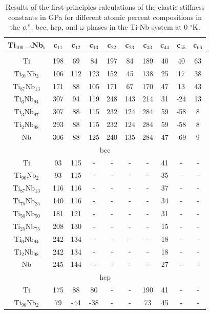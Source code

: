 \newpage
\begin{longtable}[H]{ c c c c c c c c c c }
	\caption{Results of the first-principles calculations of the elastic stiffness constants in GPa for different atomic percent compositions in the $\alpha"$, bcc, hcp, and $\omega$  phases in the Ti-Nb system at 0 $^\circ$K.} 	\label{Ch7-table:tinbdata} \\
	\hline
	Ti$_{100-b}$Nb$_b$ & c$_{11}$ & c$_{12}$ & c$_{13}$ & c$_{22}$ & c$_{23}$ & c$_{33}$ & c$_{44}$ & c$_{55}$ & c$_{66}$\\
	\hline
	\endhead
	\hline
	\endfoot
	\multicolumn{10}{c}{$\alpha"$}\\
	\hline
	Ti & 198 & 69 & 84 & 197 & 84 & 189 & 40 & 40 & 63 \\		
	Ti$_{97}$Nb$_{3}$ & 106 & 112 & 123 & 152 & 45 & 138 & 25 & 17 & 38 \\
	Ti$_{87}$Nb$_{13}$ & 171 & 88 & 105 & 171 & 67 & 170 & 47 & 13 & 43 \\
	Ti$_{6}$Nb$_{94}$ & 307 & 94 & 119 & 248 & 143 & 214 & 31 & -24 & 13 \\
	Ti$_{3}$Nb$_{97}$ & 307 & 88 & 115 & 232 & 124 & 284 & 59 & -58 & 8 \\
	Ti$_{2}$Nb$_{98}$ & 293 & 88 & 115 & 232 & 124 & 284 & 59 & -58 & 8 \\
	Nb & 306 & 88 & 125 & 240 & 135 & 284 & 47 & -69 & 9 \\
	\hline
	\multicolumn{10}{c}{bcc}\\
	\hline
	Ti & 93 & 115 & - & - & - & - & 41 & - & - \\		
	Ti$_{98}$Nb$_{2}$ & 93 & 115 & - & - & - & - & 35 & - & - \\
	Ti$_{87}$Nb$_{13}$ & 116 & 116 & - & - & - & - & 37 & - & - \\
	Ti$_{75}$Nb$_{25}$ & 140 & 116 & - & - & - & - & 34 & - & - \\
	Ti$_{50}$Nb$_{50}$ & 181 & 121 & - & - & - & - & 31 & - & - \\
	Ti$_{25}$Nb$_{75}$ & 208 & 130 & - & - & - & - & 15 & - & - \\
	Ti$_{6}$Nb$_{94}$ & 242 & 134 & - & - & - & - & 18 & - & - \\
	Ti$_{2}$Nb$_{98}$ & 242 & 134 & - & - & - & - & 18 & - & - \\
	Nb & 245 & 144 & - & - & - & - & 27 & - & - \\
	\hline
	\multicolumn{10}{c}{hcp}\\
	\hline
	Ti & 175 & 88 & 80 & - & - & 190 & 41 & - & - \\		
	Ti$_{98}$Nb$_{2}$ & 79 & -44 & -38 & - & - & 73 & 45 & - & - \\

\end{longtable}
